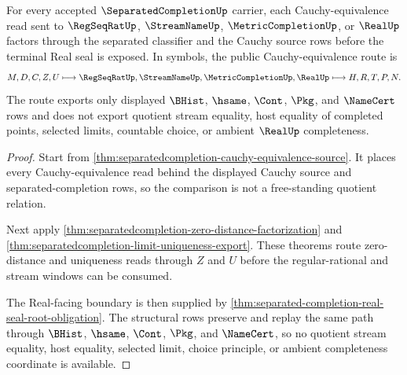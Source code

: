 \begin{theorem}
\label{thm:separated-completion-cauchy-equivalence-routing}
For every accepted $\SeparatedCompletionUp$ carrier, each Cauchy-equivalence read sent to $\RegSeqRatUp$, $\StreamNameUp$, $\MetricCompletionUp$, or $\RealUp$ factors through the separated classifier and the Cauchy source rows before the terminal Real seal is exposed. In symbols, the public Cauchy-equivalence route is
$$
M,D,C,Z,U \longmapsto \RegSeqRatUp,\StreamNameUp,\MetricCompletionUp,\RealUp \longmapsto H,R,T,P,N .
$$
The route exports only displayed $\BHist$, $\hsame$, $\Cont$, $\Pkg$, and $\NameCert$ rows and does not export quotient stream equality, host equality of completed points, selected limits, countable choice, or ambient $\RealUp$ completeness.
\end{theorem}
\begin{proof}
Start from \autoref{thm:separatedcompletion-cauchy-equivalence-source}. It places every Cauchy-equivalence read behind the displayed Cauchy source and separated-completion rows, so the comparison is not a free-standing quotient relation.

Next apply \autoref{thm:separatedcompletion-zero-distance-factorization} and \autoref{thm:separatedcompletion-limit-uniqueness-export}. These theorems route zero-distance and uniqueness reads through $Z$ and $U$ before the regular-rational and stream windows can be consumed.

The Real-facing boundary is then supplied by \autoref{thm:separated-completion-real-seal-root-obligation}. The structural rows preserve and replay the same path through $\BHist$, $\hsame$, $\Cont$, $\Pkg$, and $\NameCert$, so no quotient stream equality, host equality, selected limit, choice principle, or ambient completeness coordinate is available.
\end{proof}

